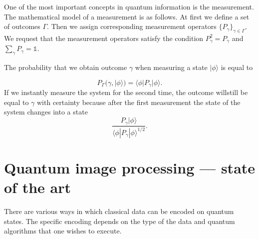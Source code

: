 \documentclass[a4paper,10pt]{llncs}
\newcommand{\ket}[1]{| #1 \rangle}
\newcommand{\bra}[1]{\langle #1 |}
\newcommand{\1}{\mathbb{1}}
\begin{document}


One of the most important concepts in quantum information is the measurement. 
The mathematical model of a measurement is as follows. At first we define a
set of outcomes $\Gamma$.  Then we assign corresponding measurement operators 
$\{P_\gamma\}_{\gamma\in\Gamma}$. We request that the measurement operators 
satisfy the condition $P_\gamma^2=P_\gamma$ and $\sum_{\gamma} P_\gamma=\1$.

The probability that we obtain outcome $\gamma$ when measuring a state 
$\ket{\phi}$ is  equal to

\begin{equation}
P_\Gamma(\gamma, \ket{\phi})=\bra{\phi}P_\gamma\ket{\phi}.\label{probab}
\end{equation}
 If we
instantly measure the system for the second time, the outcome willstill be 
equal to
$\gamma$ with certainty because after the first measurement the state of the 
system changes into a state
$$
\frac{P_\gamma\ket{\phi}}{\bra{\phi} P_\gamma\ket{\phi}^{1/2}}.
$$

\section{Quantum image processing --- state of the art}
There are various ways in which classical data can be encoded on quantum states.
The specific encoding depends on the type of the data and quantum algorithms
that one wishes to execute.
\end{document}
